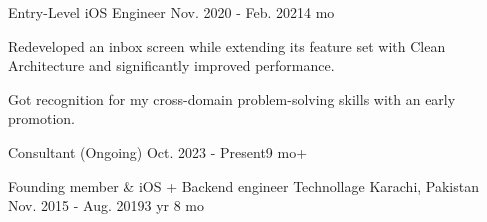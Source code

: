 \begin{cventries}
  \cventry
  {Entry-Level iOS Engineer} %
  {} %
  {} %
  {Nov. 2020 - Feb. 2021{\enskip\cdotp\enskip}4 mo} %
  {
    \begin{cvitems} %
      \item {Redeveloped an inbox screen while extending its feature set with Clean Architecture and significantly improved performance.}
      \item {Got recognition for my cross-domain problem-solving skills with an early promotion.}
    \end{cvitems}
  }

  \cventry
  {Consultant (Ongoing)} %
  {}
  {}
  {Oct. 2023 - Present{\enskip\cdotp\enskip}9 mo+} %
  {
  }

  \cventry
  {Founding member \& iOS + Backend engineer} %
  {Technollage} %
  {Karachi, Pakistan} %
  {Nov. 2015 - Aug. 2019{\enskip\cdotp\enskip}3 yr 8 mo} %
  {
  }

\end{cventries}
